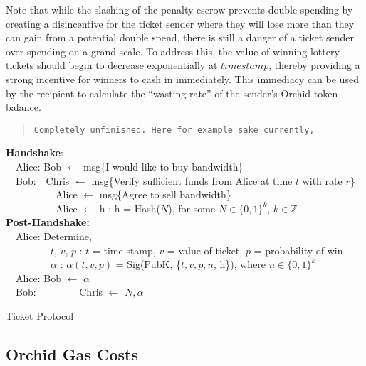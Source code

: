 Note that while the slashing of the penalty escrow prevents double-spending by creating a disincentive for the ticket sender where they will lose more than they can gain from a potential double spend, there is still a danger of a ticket sender over-spending on a grand scale. To address this, the value of winning lottery tickets should begin to decrease exponentially at $timestamp$, thereby providing a strong incentive for winners to cash in immediately. This immediacy can be used by the recipient to calculate the ``wasting rate'' of the sender's Orchid token balance.

\begin{quote}
	\color{red}
    \texttt{Completely unfinished. Here for example sake currently,}
\end{quote}
\begin{algorithm}[H]

    \textbf{Handshake}:\\
    ~~Alice: Bob $\gets$ msg\{I would like to buy bandwidth\}\\
    ~~Bob:~~Chris $\gets$ msg\{Verify sufficient funds from Alice at time $t$ with rate $r$\}\\
    ~~~~~~~~~~Alice $\gets$ msg\{Agree to sell bandwidth\}\\
    ~~~~~~~~~~Alice $\gets$ h :  h = Hash($N$), for some $N \in \{0,1\}^k$, $k \in \mathbb{Z}$\\
    \textbf{Post-Handshake:}\\
    ~~Alice: Determine,\\
    ~~~~~~~~~$t$, $v$, $p$ : $t$ = time stamp, $v$ = value of ticket, $p$ = probability of win\\
    ~~~~~~~~~$\alpha$ : $\alpha (t, v, p)$ = Sig(PubK, \{$t, v, p, n$, h\}), where $n \in \{0,1\}^k$\\
    ~~Alice: Bob $\gets$ $\alpha$\\
    ~~Bob: 
    ~~~~~~~~Chris $\gets$ $N, \alpha$
\caption{Ticket Protocol}
\end{algorithm}

\subsection{Orchid Gas Costs}

